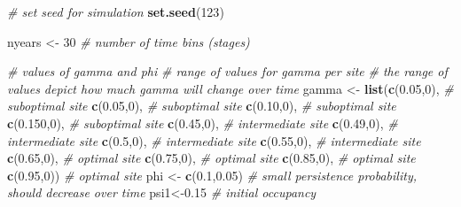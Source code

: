 \documentclass[
]{article}
\newenvironment{Shaded}{\begin{snugshade}}{\end{snugshade}}
\newcommand{\CommentTok}[1]{\textcolor[rgb]{0.56,0.35,0.01}{\textit{#1}}}
\newcommand{\DecValTok}[1]{\textcolor[rgb]{0.00,0.00,0.81}{#1}}
\newcommand{\FloatTok}[1]{\textcolor[rgb]{0.00,0.00,0.81}{#1}}
\newcommand{\FunctionTok}[1]{\textcolor[rgb]{0.13,0.29,0.53}{\textbf{#1}}}
\newcommand{\NormalTok}[1]{#1}
\newcommand{\OtherTok}[1]{\textcolor[rgb]{0.56,0.35,0.01}{#1}}
\begin{document}
\begin{Shaded}
\begin{Highlighting}[]
\CommentTok{\# set seed for simulation}
\FunctionTok{set.seed}\NormalTok{(}\DecValTok{123}\NormalTok{)}

\NormalTok{nyears }\OtherTok{\textless{}{-}} \DecValTok{30} \CommentTok{\# number of time bins (stages)}

\CommentTok{\# values of gamma and phi}
\CommentTok{\# range of values for gamma per site}
\CommentTok{\# the range of values depict how much gamma will change over time}
\NormalTok{gamma }\OtherTok{\textless{}{-}} \FunctionTok{list}\NormalTok{(}\FunctionTok{c}\NormalTok{(}\FloatTok{0.05}\NormalTok{,}\DecValTok{0}\NormalTok{), }\CommentTok{\# suboptimal site}
              \FunctionTok{c}\NormalTok{(}\FloatTok{0.05}\NormalTok{,}\DecValTok{0}\NormalTok{), }\CommentTok{\# suboptimal site}
              \FunctionTok{c}\NormalTok{(}\FloatTok{0.10}\NormalTok{,}\DecValTok{0}\NormalTok{), }\CommentTok{\# suboptimal site}
              \FunctionTok{c}\NormalTok{(}\FloatTok{0.150}\NormalTok{,}\DecValTok{0}\NormalTok{), }\CommentTok{\# suboptimal site}
              \FunctionTok{c}\NormalTok{(}\FloatTok{0.45}\NormalTok{,}\DecValTok{0}\NormalTok{), }\CommentTok{\# intermediate site}
              \FunctionTok{c}\NormalTok{(}\FloatTok{0.49}\NormalTok{,}\DecValTok{0}\NormalTok{), }\CommentTok{\# intermediate site}
              \FunctionTok{c}\NormalTok{(}\FloatTok{0.5}\NormalTok{,}\DecValTok{0}\NormalTok{), }\CommentTok{\# intermediate site}
              \FunctionTok{c}\NormalTok{(}\FloatTok{0.55}\NormalTok{,}\DecValTok{0}\NormalTok{), }\CommentTok{\# intermediate site}
              \FunctionTok{c}\NormalTok{(}\FloatTok{0.65}\NormalTok{,}\DecValTok{0}\NormalTok{), }\CommentTok{\# optimal site }
              \FunctionTok{c}\NormalTok{(}\FloatTok{0.75}\NormalTok{,}\DecValTok{0}\NormalTok{), }\CommentTok{\# optimal site}
              \FunctionTok{c}\NormalTok{(}\FloatTok{0.85}\NormalTok{,}\DecValTok{0}\NormalTok{), }\CommentTok{\# optimal site}
              \FunctionTok{c}\NormalTok{(}\FloatTok{0.95}\NormalTok{,}\DecValTok{0}\NormalTok{)) }\CommentTok{\# optimal site}
\NormalTok{phi }\OtherTok{\textless{}{-}} \FunctionTok{c}\NormalTok{(}\FloatTok{0.1}\NormalTok{,}\FloatTok{0.05}\NormalTok{) }\CommentTok{\# small persistence probability, should decrease over time}
\NormalTok{psi1}\OtherTok{\textless{}{-}}\FloatTok{0.15} \CommentTok{\# initial occupancy}
\end{Highlighting}
\end{Shaded}
\end{document}
